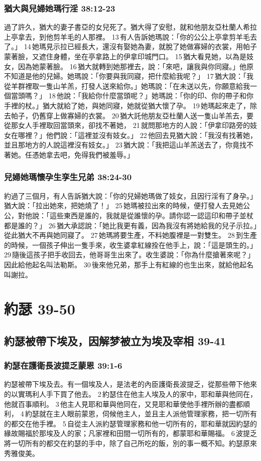 \subsubsection{猶大與兒婦她瑪行淫 38:12-23} 
過了許久，猶大的妻子書亞的女兒死了。猶大得了安慰，就和他朋友亞杜蘭人希拉上亭拿去，到他剪羊毛的人那裡。 13 有人告訴她瑪說：「你的公公上亭拿剪羊毛去了。」 14 她瑪見示拉已經長大，還沒有娶她為妻，就脫了她做寡婦的衣裳，用帕子蒙著臉，又遮住身體，坐在亭拿路上的伊拿印城門口。 15 猶大看見她，以為是妓女，因為她蒙著臉。 16 猶大就轉到她那裡去，說：「來吧，讓我與你同寢。」他原不知道是他的兒婦。她瑪說：「你要與我同寢，把什麼給我呢？」 17 猶大說：「我從羊群裡取一隻山羊羔，打發人送來給你。」她瑪說：「在未送以先，你願意給我一個當頭嗎？」 18 他說：「我給你什麼當頭呢？」她瑪說：「你的印、你的帶子和你手裡的杖。」猶大就給了她，與她同寢，她就從猶大懷了孕。 19 她瑪起來走了，除去帕子，仍舊穿上做寡婦的衣裳。 20 猶大託他朋友亞杜蘭人送一隻山羊羔去，要從那女人手裡取回當頭來，卻找不著她， 21 就問那地方的人說：「伊拿印路旁的妓女在哪裡？」他們說：「這裡並沒有妓女。」 22 他回去見猶大說：「我沒有找著她，並且那地方的人說這裡沒有妓女。」 23 猶大說：「我把這山羊羔送去了，你竟找不著她。任憑她拿去吧，免得我們被羞辱。」

\subsubsection{兒婦她瑪懷孕生孪生兄弟 38:24-30} 
約過了三個月，有人告訴猶大說：「你的兒婦她瑪做了妓女，且因行淫有了身孕。」猶大說：「拉出她來，把她燒了！」 25 她瑪被拉出來的時候，便打發人去見她公公，對他說：「這些東西是誰的，我就是從誰懷的孕。請你認一認這印和帶子並杖都是誰的？」 26 猶大承認說：「她比我更有義，因為我沒有將她給我的兒子示拉。」從此猶大不再與她同寢了。 27 她瑪將要生產，不料她腹裡是一對雙生。 28 到生產的時候，一個孩子伸出一隻手來，收生婆拿紅線拴在他手上，說：「這是頭生的。」 29 隨後這孩子把手收回去，他哥哥生出來了。收生婆說：「你為什麼搶著來呢？」因此給他起名叫法勒斯。 30 後來他兄弟，那手上有紅線的也生出來，就給他起名叫謝拉。


\section{約瑟 39-50}
\subsection{約瑟被帶下埃及，因解梦被立为埃及宰相 39-41} 
\subsubsection{約瑟在護衛長波提乏蒙恩 39:1-6} 
約瑟被帶下埃及去。有一個埃及人，是法老的內臣護衛長波提乏，從那些帶下他來的以實瑪利人手下買了他去。 2 約瑟住在他主人埃及人的家中，耶和華與他同在，他就百事順利。 3 他主人見耶和華與他同在，又見耶和華使他手裡所辦的盡都順利， 4 約瑟就在主人眼前蒙恩，伺候他主人，並且主人派他管理家務，把一切所有的都交在他手裡。 5 自從主人派約瑟管理家務和他一切所有的，耶和華就因約瑟的緣故賜福於那埃及人的家；凡家裡和田間一切所有的，都蒙耶和華賜福。 6 波提乏將一切所有的都交在約瑟的手中，除了自己所吃的飯，別的事一概不知。約瑟原來秀雅俊美。

